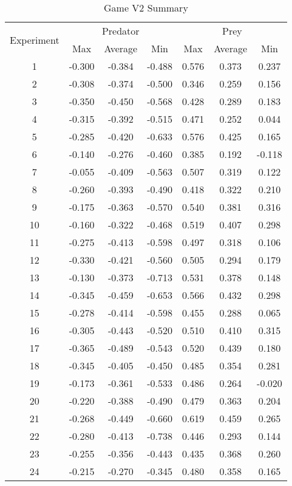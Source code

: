 \begin{table}
  \centering
  \begin{tabular}{|c|c|c|c|c|c|c|}
    \hline
    \multirow{2}{*}{Experiment} & \multicolumn{3}{|c|}{Predator} & \multicolumn{3}{|c|}{Prey} \\\cline{2-7}
    & Max & Average & Min & Max & Average & Min\\
    \hline
    1 & -0.300 & -0.384 & -0.488 & 0.576 & 0.373 & 0.237 \\
2 & -0.308 & -0.374 & -0.500 & 0.346 & 0.259 & 0.156 \\
3 & -0.350 & -0.450 & -0.568 & 0.428 & 0.289 & 0.183 \\
4 & -0.315 & -0.392 & -0.515 & 0.471 & 0.252 & 0.044 \\
5 & -0.285 & -0.420 & -0.633 & 0.576 & 0.425 & 0.165 \\
6 & -0.140 & -0.276 & -0.460 & 0.385 & 0.192 & -0.118 \\
7 & -0.055 & -0.409 & -0.563 & 0.507 & 0.319 & 0.122 \\
8 & -0.260 & -0.393 & -0.490 & 0.418 & 0.322 & 0.210 \\
9 & -0.175 & -0.363 & -0.570 & 0.540 & 0.381 & 0.316 \\
10 & -0.160 & -0.322 & -0.468 & 0.519 & 0.407 & 0.298 \\
11 & -0.275 & -0.413 & -0.598 & 0.497 & 0.318 & 0.106 \\
12 & -0.330 & -0.421 & -0.560 & 0.505 & 0.294 & 0.179 \\
13 & -0.130 & -0.373 & -0.713 & 0.531 & 0.378 & 0.148 \\
14 & -0.345 & -0.459 & -0.653 & 0.566 & 0.432 & 0.298 \\
15 & -0.278 & -0.414 & -0.598 & 0.455 & 0.288 & 0.065 \\
16 & -0.305 & -0.443 & -0.520 & 0.510 & 0.410 & 0.315 \\
17 & -0.365 & -0.489 & -0.543 & 0.520 & 0.439 & 0.180 \\
18 & -0.345 & -0.405 & -0.450 & 0.485 & 0.354 & 0.281 \\
19 & -0.173 & -0.361 & -0.533 & 0.486 & 0.264 & -0.020 \\
20 & -0.220 & -0.388 & -0.490 & 0.479 & 0.363 & 0.204 \\
21 & -0.268 & -0.449 & -0.660 & 0.619 & 0.459 & 0.265 \\
22 & -0.280 & -0.413 & -0.738 & 0.446 & 0.293 & 0.144 \\
23 & -0.255 & -0.356 & -0.443 & 0.435 & 0.368 & 0.260 \\
24 & -0.215 & -0.270 & -0.345 & 0.480 & 0.358 & 0.165 \\

    \hline
  \end{tabular}
  \caption{Game V2 Summary}
  \label{tab:v2-summary}
\end{table}

